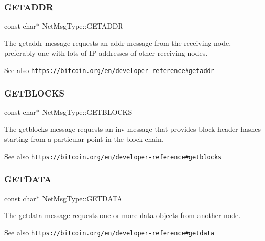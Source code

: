 \subsubsection{\texorpdfstring{G\+E\+T\+A\+D\+DR}{GETADDR}}
{\footnotesize\ttfamily const char$\ast$ Net\+Msg\+Type\+::\+G\+E\+T\+A\+D\+DR}

The getaddr message requests an addr message from the receiving node, preferably one with lots of IP addresses of other receiving nodes. \begin{DoxySeeAlso}{See also}
\href{https://bitcoin.org/en/developer-reference#getaddr}{\tt https\+://bitcoin.\+org/en/developer-\/reference\#getaddr} 
\end{DoxySeeAlso}
\mbox{\label{namespace_net_msg_type_a339e2b6356faf1099abfcd0660119630}} 
\subsubsection{\texorpdfstring{G\+E\+T\+B\+L\+O\+C\+KS}{GETBLOCKS}}
{\footnotesize\ttfamily const char$\ast$ Net\+Msg\+Type\+::\+G\+E\+T\+B\+L\+O\+C\+KS}

The getblocks message requests an inv message that provides block header hashes starting from a particular point in the block chain. \begin{DoxySeeAlso}{See also}
\href{https://bitcoin.org/en/developer-reference#getblocks}{\tt https\+://bitcoin.\+org/en/developer-\/reference\#getblocks} 
\end{DoxySeeAlso}
\mbox{\label{namespace_net_msg_type_aab9eca9c73a0a211603dcc14e85474bf}} 
\subsubsection{\texorpdfstring{G\+E\+T\+D\+A\+TA}{GETDATA}}
{\footnotesize\ttfamily const char$\ast$ Net\+Msg\+Type\+::\+G\+E\+T\+D\+A\+TA}

The getdata message requests one or more data objects from another node. \begin{DoxySeeAlso}{See also}
\href{https://bitcoin.org/en/developer-reference#getdata}{\tt https\+://bitcoin.\+org/en/developer-\/reference\#getdata} 
\end{DoxySeeAlso}
\mbox{\label{namespace_net_msg_type_aca0674dd34a9d5a86b507ba60a5fa6a4}} 
